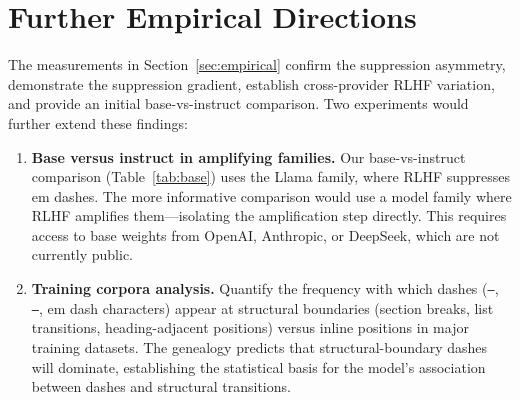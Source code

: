 \section{Further Empirical Directions}
\label{sec:tests}

The measurements in Section~\ref{sec:empirical} confirm the suppression asymmetry, demonstrate the suppression gradient, establish cross-provider RLHF variation, and provide an initial base-vs-instruct comparison. Two experiments would further extend these findings:

\begin{enumerate}[leftmargin=*]

\item \textbf{Base versus instruct in amplifying families.} Our base-vs-instruct comparison (Table~\ref{tab:base}) uses the Llama family, where RLHF suppresses em dashes. The more informative comparison would use a model family where RLHF amplifies them---isolating the amplification step directly. This requires access to base weights from OpenAI, Anthropic, or DeepSeek, which are not currently public.

\item \textbf{Training corpora analysis.} Quantify the frequency with which dashes (\texttt{---}, \texttt{--}, em dash characters) appear at structural boundaries (section breaks, list transitions, heading-adjacent positions) versus inline positions in major training datasets. The genealogy predicts that structural-boundary dashes will dominate, establishing the statistical basis for the model's association between dashes and structural transitions.

\end{enumerate}
